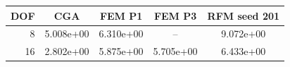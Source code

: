 \begin{tabular}{rcccc}
\toprule
DOF & CGA & FEM P1 & FEM P3 & RFM seed 201 \\
\midrule
8 & 5.008e+00 & 6.310e+00 & -- & 9.072e+00 \\
16 & 2.802e+00 & 5.875e+00 & 5.705e+00 & 6.433e+00 \\
\bottomrule
\end{tabular}
